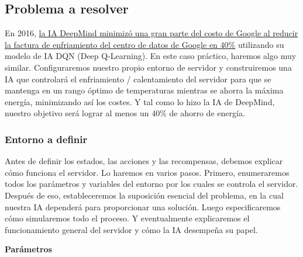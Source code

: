 \documentclass[
]{book}
\begin{document}
\hypertarget{problema-a-resolver-1}{%
\subsection{Problema a resolver}\label{problema-a-resolver-1}}

En 2016, \href{https://deepmind.com/blog/deepmind-ai-reduces-google-data-centre-cooling-bill-40/}{la IA DeepMind minimizó una gran parte del costo de Google al reducir la factura de enfriamiento del centro de datos de Google en 40\%} utilizando su modelo de IA DQN (Deep Q-Learning). En este caso práctico, haremos algo muy similar. Configuraremos nuestro propio entorno de servidor y construiremos una IA que controlará el enfriamiento / calentamiento del servidor para que se mantenga en un rango óptimo de temperaturas mientras se ahorra la máxima energía, minimizando así los costes. Y tal como lo hizo la IA de DeepMind, nuestro objetivo será lograr al menos un 40\% de ahorro de energía.

\hypertarget{entorno-a-definir-1}{%
\subsubsection{Entorno a definir}\label{entorno-a-definir-1}}

Antes de definir los estados, las acciones y las recompensas, debemos explicar cómo funciona el servidor. Lo haremos en varios pasos. Primero, enumeraremos todos los parámetros y variables del entorno por los cuales se controla el servidor. Después de eso, estableceremos la suposición esencial del problema, en la cual nuestra IA dependerá para proporcionar una solución. Luego especificaremos cómo simularemos todo el proceso. Y eventualmente explicaremos el funcionamiento general del servidor y cómo la IA desempeña su papel.

\textbf{Parámetros}
\end{document}
